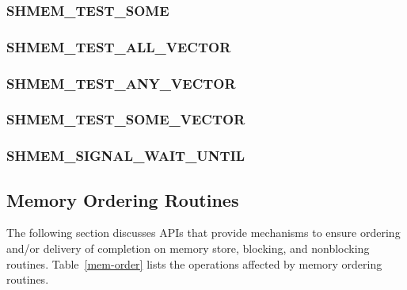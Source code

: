 \documentclass[10pt,oneside]{book}
\begin{document}
\subsubsection{\textbf{SHMEM\_TEST\_SOME}}\label{subsec:shmem_test_some}


\subsubsection{\textbf{SHMEM\_TEST\_ALL\_VECTOR}}\label{subsec:shmem_test_all_vector}


\subsubsection{\textbf{SHMEM\_TEST\_ANY\_VECTOR}}\label{subsec:shmem_test_any_vector}


\subsubsection{\textbf{SHMEM\_TEST\_SOME\_VECTOR}}\label{subsec:shmem_test_some_vector}


\subsubsection{\textbf{SHMEM\_SIGNAL\_WAIT\_UNTIL}}\label{subsec:shmem_signal_wait_until}




\subsection{Memory Ordering Routines}\label{subsec:memory_order}
The following section discusses \openshmem \acp{API} that provide mechanisms to
ensure ordering and/or delivery of completion on memory store, blocking, and
nonblocking \openshmem routines. Table~\ref{mem-order} lists the operations
affected by \openshmem memory ordering routines.
\end{document}

